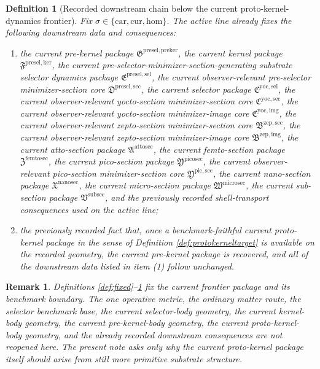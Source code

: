 \documentclass[11pt]{article}
\newcommand{\Car}{\mathrm{car}}
\newcommand{\Cur}{\mathrm{cur}}
\newcommand{\Hom}{\mathrm{hom}}
\newcommand{\SubSectionPackage}{\mathfrak V^{\mathrm{subsec}}}
\newcommand{\MicroSectionPackage}{\mathfrak W^{\mathrm{microsec}}}
\newcommand{\NanoSectionPackage}{\mathfrak X^{\mathrm{nanosec}}}
\newcommand{\PicoSectionPackage}{\mathfrak Y^{\mathrm{picosec}}}
\newcommand{\PicoMinSectionCore}{\mathfrak Y^{\mathrm{pic,sec}}}
\newcommand{\FemtoSectionPackage}{\mathfrak Z^{\mathrm{femtosec}}}
\newcommand{\AttoSectionPackage}{\mathfrak A^{\mathrm{attosec}}}
\newcommand{\ZeptoImageCore}{\mathfrak B^{\mathrm{zep,img}}}
\newcommand{\ZeptoMinSectionCore}{\mathfrak B^{\mathrm{zep,sec}}}
\newcommand{\YoctoImageCore}{\mathfrak C^{\mathrm{yoc,img}}}
\newcommand{\YoctoMinSectionCore}{\mathfrak C^{\mathrm{yoc,sec}}}
\newcommand{\YoctoSelectorPackage}{\mathfrak C^{\mathrm{yoc,sel}}}
\newcommand{\PreSelectorMinSectionCore}{\mathfrak D^{\mathrm{presel,sec}}}
\newcommand{\PreSectionSelectorPackage}{\mathfrak E^{\mathrm{presel,sel}}}
\newcommand{\KernelPackage}{\mathfrak F^{\mathrm{presel,ker}}}
\newcommand{\PreKernelPackage}{\mathfrak G^{\mathrm{presel,preker}}}
\newtheorem{definition}{Definition}
\newtheorem{remark}{Remark}
\begin{document}
\begin{definition}[Recorded downstream chain below the current proto-kernel-dynamics frontier]
\label{def:downstream}
Fix \(\sigma\in\{\Car,\Cur,\Hom\}\). The active line already fixes the following downstream data and consequences:
\begin{enumerate}
    \item the current pre-kernel package \(\PreKernelPackage\), the current kernel package \(\KernelPackage\), the current pre-selector-minimizer-section-generating substrate selector dynamics package \(\PreSectionSelectorPackage\), the current observer-relevant pre-selector minimizer-section core \(\PreSelectorMinSectionCore\), the current selector package \(\YoctoSelectorPackage\), the current observer-relevant yocto-section minimizer-section core \(\YoctoMinSectionCore\), the current observer-relevant yocto-section minimizer-image core \(\YoctoImageCore\), the current observer-relevant zepto-section minimizer-section core \(\ZeptoMinSectionCore\), the current observer-relevant zepto-section minimizer-image core \(\ZeptoImageCore\), the current atto-section package \(\AttoSectionPackage\), the current femto-section package \(\FemtoSectionPackage\), the current pico-section package \(\PicoSectionPackage\), the current observer-relevant pico-section minimizer-section core \(\PicoMinSectionCore\), the current nano-section package \(\NanoSectionPackage\), the current micro-section package \(\MicroSectionPackage\), the current sub-section package \(\SubSectionPackage\), and the previously recorded shell-transport consequences used on the active line;
    \item the previously recorded fact that, once a benchmark-faithful current proto-kernel package in the sense of Definition \ref{def:protokerneltarget} is available on the recorded geometry, the current pre-kernel package is recovered, and all of the downstream data listed in item (1) follow unchanged.
\end{enumerate}
\end{definition}

\begin{remark}
Definitions \ref{def:fixed}--\ref{def:downstream} fix the current frontier package and its benchmark boundary. The one operative metric, the ordinary matter route, the selector benchmark base, the current selector-body geometry, the current kernel-body geometry, the current pre-kernel-body geometry, the current proto-kernel-body geometry, and the already recorded downstream consequences are not reopened here. The present note asks only why the current proto-kernel package itself should arise from still more primitive substrate structure.
\end{remark}
\end{document}
